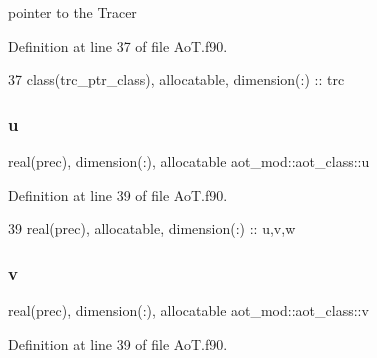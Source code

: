 pointer to the Tracer 



Definition at line 37 of file Ao\+T.\+f90.


\begin{DoxyCode}
37         \textcolor{keywordtype}{class}(trc\_ptr\_class), \textcolor{keywordtype}{allocatable}, \textcolor{keywordtype}{dimension(:)} :: trc
\end{DoxyCode}
\mbox{\label{structaot__mod_1_1aot__class_a3aab3baa9fb76719b7d2179d0be7879c}} 
\subsubsection{\texorpdfstring{u}{u}}
{\footnotesize\ttfamily real(prec), dimension(\+:), allocatable aot\+\_\+mod\+::aot\+\_\+class\+::u\hspace{0.3cm}{\ttfamily [private]}}



Definition at line 39 of file Ao\+T.\+f90.


\begin{DoxyCode}
39         \textcolor{keywordtype}{real(prec)}, \textcolor{keywordtype}{allocatable}, \textcolor{keywordtype}{dimension(:)} :: u,v,w
\end{DoxyCode}
\mbox{\label{structaot__mod_1_1aot__class_a5ff46826ac545ade3a41d66c174870f8}} 
\subsubsection{\texorpdfstring{v}{v}}
{\footnotesize\ttfamily real(prec), dimension(\+:), allocatable aot\+\_\+mod\+::aot\+\_\+class\+::v\hspace{0.3cm}{\ttfamily [private]}}



Definition at line 39 of file Ao\+T.\+f90.

\mbox{\label{structaot__mod_1_1aot__class_a6ec825475ad78b546b7067afec0d043f}} 
